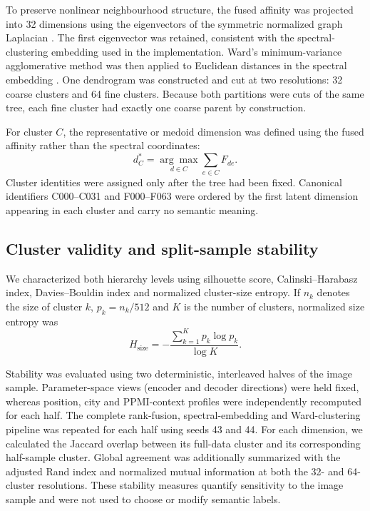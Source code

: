 To preserve nonlinear neighbourhood structure, the fused affinity was projected
into 32 dimensions using the eigenvectors of the symmetric normalized graph
Laplacian \cite{ng2001spectral}. The first eigenvector was retained, consistent
with the spectral-clustering embedding used in the implementation. Ward's
minimum-variance agglomerative method was then applied to Euclidean distances in
the spectral embedding \cite{ward1963hierarchical}. One dendrogram was
constructed and cut at two resolutions: 32 coarse clusters and 64 fine clusters.
Because both partitions were cuts of the same tree, each fine cluster had
exactly one coarse parent by construction.

For cluster $C$, the representative or medoid dimension was defined using the
fused affinity rather than the spectral coordinates:
\begin{equation}
  d_C^{*}=\underset{d\in C}{\arg\max}
  \sum_{e\in C}F_{de}.
  \label{eq:cluster_medoid}
\end{equation}
Cluster identities were assigned only after the tree had been fixed. Canonical
identifiers C000--C031 and F000--F063 were ordered by the first latent dimension
appearing in each cluster and carry no semantic meaning.

\subsection{Cluster validity and split-sample stability}
\label{sec:cluster_validation}

We characterized both hierarchy levels using silhouette score,
Calinski--Harabasz index, Davies--Bouldin index and normalized cluster-size
entropy. If $n_k$ denotes the size of cluster $k$, $p_k=n_k/512$ and $K$ is the
number of clusters, normalized size entropy was
\begin{equation}
  H_{\mathrm{size}}
  =-\frac{\sum_{k=1}^{K}p_k\log p_k}{\log K}.
  \label{eq:size_entropy}
\end{equation}

Stability was evaluated using two deterministic, interleaved halves of the image
sample. Parameter-space views (encoder and decoder directions) were held fixed,
whereas position, city and PPMI-context profiles were independently recomputed
for each half. The complete rank-fusion, spectral-embedding and Ward-clustering
pipeline was repeated for each half using seeds 43 and 44. For each dimension,
we calculated the Jaccard overlap between its full-data cluster and its
corresponding half-sample cluster. Global agreement was additionally summarized
with the adjusted Rand index and normalized mutual information at both the
32- and 64-cluster resolutions. These stability measures quantify sensitivity to
the image sample and were not used to choose or modify semantic labels.

